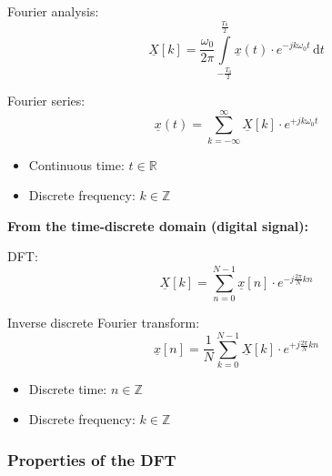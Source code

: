 \begin{refsection}
\begin{minipage}{0.45\linewidth}
	\vspace{0.5em}
	
	Fourier analysis:
	\begin{equation*}
		\underline{X}[k] = \frac{\omega_0}{2 \pi} \int\limits_{-\frac{T_0}{2}}^{\frac{T_0}{2}} \underline{x}(t) \cdot e^{-j k \omega_0 t} \, \mathrm{d} t
	\end{equation*}
	
	Fourier series:
	\begin{equation*}
		\underline{x}(t) = \sum\limits_{k = -\infty}^{\infty} \underline{X}[k] \cdot e^{+ j k \omega_0 t}
	\end{equation*}
	
	\begin{itemize}
		\item Continuous time: $t \in \mathbb{R}$
		\item Discrete frequency: $k \in \mathbb{Z}$
	\end{itemize}
\end{minipage}
\hfill
\begin{minipage}{0.45\linewidth}
	\textbf{From the time-discrete domain (digital signal):}
	
	\vspace{0.5em}
	
	\acf{DFT}:
	\begin{equation*}
		\underline{X}[k] = \sum\limits_{n = 0}^{N - 1} \underline{x}[n] \cdot e^{- j \frac{2 \pi}{N} k n}
	\end{equation*}
	
	Inverse discrete Fourier transform:
	\begin{equation*}
		\underline{x}[n] = \frac{1}{N} \sum\limits_{k = 0}^{N - 1} \underline{X}[k]  \cdot e^{+ j \frac{2 \pi}{N} k n}
	\end{equation*}
	
	\begin{itemize}
		\item Discrete time: $n \in \mathbb{Z}$
		\item Discrete frequency: $k \in \mathbb{Z}$
	\end{itemize}
\end{minipage}

\subsubsection{Properties of the \acs{DFT}}


\end{refsection}
